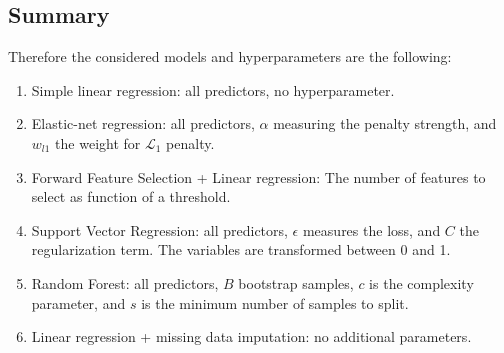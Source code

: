 \subsection{Summary} 

Therefore the considered models and hyperparameters are the following:

\begin{enumerate}
    \item Simple linear regression: all predictors, no hyperparameter. 
    \item Elastic-net regression: all predictors, $\alpha$ measuring the
    penalty strength, and $w_{l1}$ the weight for $\mathcal{L}_1$ penalty. 
    \item Forward Feature Selection + Linear regression: The number of
    features to select as function of a threshold.
    \item Support Vector Regression: all predictors, $\epsilon$ measures the
    loss, and $C$ the regularization term. The variables are transformed
    between 0 and 1. 
    \item Random Forest: all predictors, $B$ bootstrap samples, $c$ is the
    complexity parameter, and $s$ is the minimum number of samples to split. 
    \item Linear regression + missing data imputation: no additional
    parameters. 
\end{enumerate}